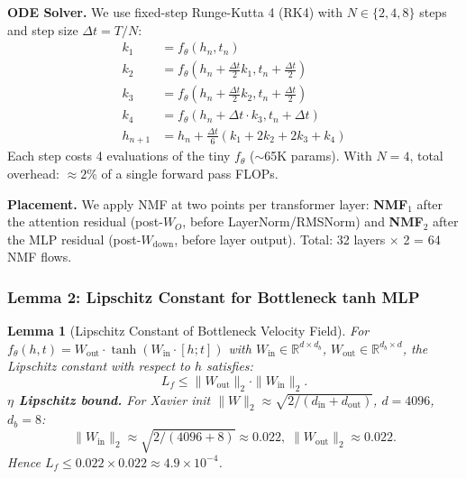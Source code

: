\documentclass{scpe}
\newtheorem{lemma}[theorem]{Lemma}
\newcommand{\RR}{\mathbb{R}}
\begin{document}
\textbf{ODE Solver.} We use fixed-step Runge-Kutta 4 (RK4) with $N \in \{2, 4, 8\}$ steps and step size $\Delta t = T/N$:
\begin{align}
k_1 &= f_\theta(h_n, t_n) \nonumber\\
k_2 &= f_\theta(h_n + \tfrac{\Delta t}{2}k_1, t_n + \tfrac{\Delta t}{2}) \nonumber\\
k_3 &= f_\theta(h_n + \tfrac{\Delta t}{2}k_2, t_n + \tfrac{\Delta t}{2}) \nonumber\\
k_4 &= f_\theta(h_n + \Delta t \cdot k_3, t_n + \Delta t) \nonumber\\
h_{n+1} &= h_n + \frac{\Delta t}{6}(k_1 + 2k_2 + 2k_3 + k_4)
\end{align}
Each step costs 4 evaluations of the tiny $f_\theta$ ($\sim$65K params). With $N=4$, total overhead: $\approx 2\%$ of a single forward pass FLOPs.

\textbf{Placement.} We apply NMF at two points per transformer layer: \textbf{NMF}$_1$ after the attention residual (post-$W_O$, before LayerNorm/RMSNorm) and \textbf{NMF}$_2$ after the MLP residual (post-$W_{\text{down}}$, before layer output). Total: 32 layers $\times$ 2 = 64 NMF flows.

\subsubsection{Lemma 2: Lipschitz Constant for Bottleneck tanh MLP}

\begin{lemma}[Lipschitz Constant of Bottleneck Velocity Field]
\label{lem:lipschitz-nmf}
For $f_\theta(h, t) = W_{\text{out}} \cdot \tanh(W_{\text{in}} \cdot [h;t])$ with $W_{\text{in}} \in \RR^{d \times d_b}$, $W_{\text{out}} \in \RR^{d_b \times d}$, the Lipschitz constant with respect to $h$ satisfies:
\begin{equation}
L_f \leq \|W_{\text{out}}\|_2 \cdot \|W_{\text{in}}\|_2.
\end{equation}
\textbf{$\eta$ Lipschitz bound.} For Xavier init $\|W\|_2 \approx \sqrt{2/(d_{\text{in}}{+}d_{\text{out}})}$, $d{=}4096$, $d_b{=}8$:
\begin{equation}
\|W_{\text{in}}\|_2 \approx \sqrt{2/(4096{+}8)} \approx 0.022,\; \|W_{\text{out}}\|_2 \approx 0.022.
\end{equation}
Hence $L_f \leq 0.022 \times 0.022 \approx 4.9 \times 10^{-4}$.
\end{lemma}
\end{document}
